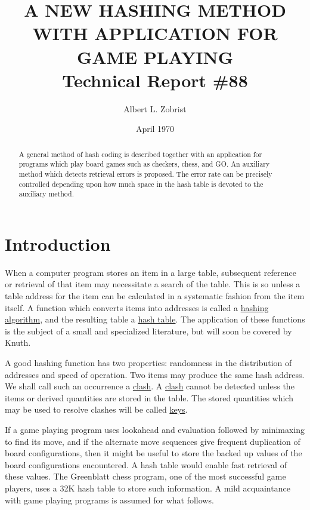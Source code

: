 \documentclass{article}
\date{April 1970}
\begin{document}
\title{A NEW HASHING METHOD WITH APPLICATION FOR GAME PLAYING\\ {\small Technical Report \#88}}
\author{Albert L. Zobrist}
\maketitle

\begin{abstract}
A general method of hash coding is described together with an application for
programs which play board games such as checkers, chess, and GO. An auxiliary
method which detects retrieval errors is proposed. The error rate can be
precisely controlled depending upon how much space in the hash table is
devoted to the auxiliary method.
\end{abstract}

\section*{Introduction}

When a computer program stores an item in a large table, subsequent reference
or retrieval of that item may necessitate a search of the table. This is so
unless a table address for the item can be calculated in a systematic fashion
from the item itself. A function which converts items into addresses is called
a \underline{hashing algorithm}, and the resulting table a \underline{hash
table}. The application of these functions is the subject of a small and
specialized literature, but will soon be covered by Knuth\cite{knuth}.

A good hashing function has two properties: randomness in the distribution of
addresses and speed of operation. Two items may produce the same hash address.
We shall call such an occurrence a \underline{clash}. A \underline{clash}
cannot be detected unless the items or derived quantities are stored in the
table. The stored quantities which may be used to resolve clashes will be called
\underline{keys}.

If a game playing program uses lookahead and evaluation followed by minimaxing
to find its move, and if the alternate move sequences give frequent duplication
of board configurations, then it might be useful to store the backed up values
of the board configurations encountered. A hash table would enable fast
retrieval of these values. The Greenblatt chess program\cite{greenblatt}, one
of the most successful game players, uses a 32K hash table to store such
information. A mild acquaintance with game playing programs is assumed for what
follows.
\end{document}
